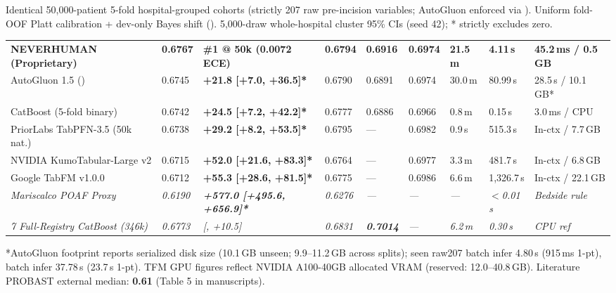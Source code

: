 \documentclass[10pt,letterpaper]{article}
\begin{document}
{\noindent\sffamily\fontsize{6.55}{8.0}\selectfont\color{sub}Identical 50,000-patient 5-fold hospital-grouped cohorts (strictly 207 raw pre-incision variables; AutoGluon enforced via ). Uniform fold-OOF Platt calibration + dev-only Bayes shift (). 5,000-draw whole-hospital cluster 95\% CIs (seed 42); * strictly excludes zero.\par}

\vspace{2.2pt}
\noindent
{\fontsize{6.95}{8.55}\selectfont\setlength{\tabcolsep}{2.4pt}
\begin{tabularx}{\textwidth}{@{}Y R{1.00cm} R{2.30cm} R{0.92cm} R{0.92cm} R{1.10cm} R{1.12cm} R{1.05cm} R{1.35cm}@{}}
\toprule
{} &  &  &  &  &  &  &  &  \\
\midrule
{}
\textbf{NEVERHUMAN (Proprietary)} & \textbf{0.6767} & \textbf{\#1 @ 50k (0.0072 ECE)} & \textbf{0.6794} & \textbf{0.6916} & \textbf{0.6974} & \textbf{21.5\,m} & \textbf{4.11\,s} & \textbf{45.2\,ms / 0.5\,GB} \\
AutoGluon 1.5 () & 0.6745 & \textbf{+21.8 [+7.0, +36.5]*} & 0.6790 & 0.6891 & 0.6974 & 30.0\,m & 80.99\,s & 28.5\,s / 10.1\,GB* \\
CatBoost (5-fold binary) & 0.6742 & \textbf{+24.5 [+7.2, +42.2]*} & 0.6777 & 0.6886 & 0.6966 & 0.8\,m & 0.15\,s & 3.0\,ms / CPU \\
PriorLabs TabPFN-3.5 (50k nat.) & 0.6738 & \textbf{+29.2 [+8.2, +53.5]*} & 0.6795 & --- & 0.6982 & 0.9\,s & 515.3\,s & In-ctx / 7.7\,GB \\
NVIDIA KumoTabular-Large v2 & 0.6715 & \textbf{+52.0 [+21.6, +83.3]*} & 0.6764 & --- & 0.6977 & 3.3\,m & 481.7\,s & In-ctx / 6.8\,GB \\
Google TabFM v1.0.0 & 0.6712 & \textbf{+55.3 [+28.6, +81.5]*} & 0.6775 & --- & 0.6986 & 6.6\,m & 1,326.7\,s & In-ctx / 22.1\,GB \\
\midrule
\textit{Mariscalco POAF Proxy} & \textit{0.6190} & \textit{\textbf{+577.0 [+495.6, +656.9]*}} & \textit{0.6276} & \textit{---} & \textit{---} & \textit{---} & \textit{$<$0.01\,s} & \textit{Bedside rule} \\
\textit{7\x{} Full-Registry CatBoost (346k)} & \textit{0.6773} & \textit{ [, +10.5]} & \textit{0.6831} & \textit{\textbf{0.7014}} & \textit{---} & \textit{6.2\,m} & \textit{0.30\,s} & \textit{CPU ref} \\
\bottomrule
\end{tabularx}}
\vspace{1.2pt}
{\noindent\sffamily\fontsize{6.0}{7.4}\selectfont\color{sub}*AutoGluon footprint reports serialized disk size (10.1\,GB unseen; 9.9--11.2\,GB across splits); seen raw207 batch infer 4.80\,s (915\,ms 1-pt),  batch infer 37.78\,s (23.7\,s 1-pt). TFM GPU figures reflect NVIDIA A100-40GB allocated VRAM (reserved: 12.0--40.8\,GB). Literature PROBAST external median: \textbf{0.61} (Table 5 in manuscripts).\par}
\end{document}
